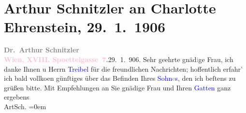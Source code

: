 

               \section[Arthur Schnitzler an Charlotte Ehrenstein, 29. 1. 1906]{ Arthur Schnitzler an Charlotte Ehrenstein,
                    29. 1. 1906}\nopagebreak{}\rehead{ }\normalsize\beginnumbering{} \toendnotes[C]{\smallbreak\pagebreak[2]} 
\toendnotes[C]{\smallbreak}\pstart
           \noindent{}{\pb}\textcolor{gray}{\textbf{Dr. Arthur Schnitzler}}{\\}\textcolor{gray}{\textbf{\textcolor{pink}{Wien, XVIII. Spoettelgasse 7}{}\ledrightnote{\textcolor{pink}{Edmund-Weiß-Gasse}}.}}\hfill 29. 1. 906. \pend
           \pstart
           Sehr geehrte gnäd\textcolor{gray}{i}ge Frau, ich danke Ihnen u
                    Herrn \textcolor{blue}{Treibel}{}\ledrightnote{\textcolor{blue}{Adolf Treibl}} für die freundlichen
                    Nachrichten; hoffentlich erfahr’ ich bald vollko{\geminationm}en
                    günſtiges über das Befinden Ihres \textcolor{blue}{Sohn\textcolor{gray}{e}s}{}, den ich {\pb}beſtens zu grüßen bitte.\pend
           \pstart
           Mit Empfehlungen an Sie gnädige Frau und Ihren \textcolor{blue}{Gatten}{}\pend
           \pstart
           ganz ergebens{\\[\baselineskip]}\spacefill\mbox{ArtSch.}\pend
           \leftskip=0em{}\endnumbering{}  
      
